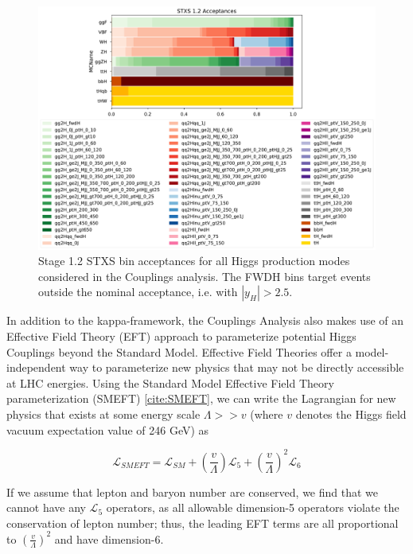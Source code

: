 \begin{figure}[tbp]
        \centering
        \includegraphics[width=\linewidth]{figures/theory_chapter/STXS_acceptances.pdf}
        \caption{Stage 1.2 STXS bin acceptances for all Higgs production modes considered in the Couplings analysis. The FWDH bins target events outside the nominal acceptance, i.e. with $|y_{H}|>2.5$.}
        \label{fig:STXS_acceptances}
\end{figure}


\iffalse
In addition to the kappa-framework, the Couplings Analysis also makes use of an Effective Field Theory (EFT) approach to parameterize potential Higgs Couplings beyond the Standard Model. Effective Field Theories offer a model-independent way to parameterize new physics that may not be directly accessible at LHC energies. Using the Standard Model Effective Field Theory parameterization (SMEFT) \ref{cite:SMEFT}, we can write the Lagrangian for new physics that exists at some energy scale $\Lambda >> v$ (where $v$ denotes the Higgs field vacuum expectation value of 246 GeV) as

\begin{equation}
\mathcal{L}_{SMEFT} = \mathcal{L}_{SM} + (\frac{v}{\Lambda})\mathcal{L}_{5} + (\frac{v}{\Lambda})^2 \mathcal{L}_{6}
\end{equation}

If we assume that lepton and baryon number are conserved, we find that we cannot have any $\mathcal{L}_{5}$ operators, as all allowable dimension-5 operators violate the conservation of lepton number; thus, the leading EFT terms are all proportional to $(\frac{v}{\Lambda})^2$ and have dimension-6.

